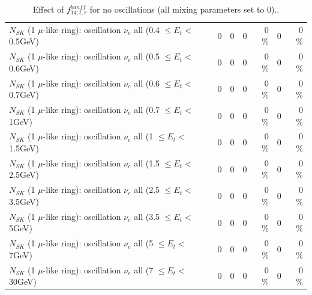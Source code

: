 \begin{table}
\begin{tabular}{| l | r | r | r  r | r  r |}
$N_{SK}$ (1 $\mu$-like ring): oscillation $\nu_{e}$ all (0.4 $\leq E_{t} <$ 0.5GeV) &               0 &               0 &               0 &        0 \%  &               0 &        0 \%  \\ 
$N_{SK}$ (1 $\mu$-like ring): oscillation $\nu_{e}$ all (0.5 $\leq E_{t} <$ 0.6GeV) &               0 &               0 &               0 &        0 \%  &               0 &        0 \%  \\ 
$N_{SK}$ (1 $\mu$-like ring): oscillation $\nu_{e}$ all (0.6 $\leq E_{t} <$ 0.7GeV) &               0 &               0 &               0 &        0 \%  &               0 &        0 \%  \\ 
$N_{SK}$ (1 $\mu$-like ring): oscillation $\nu_{e}$ all (0.7 $\leq E_{t} <$ 1GeV) &               0 &               0 &               0 &        0 \%  &               0 &        0 \%  \\ 
$N_{SK}$ (1 $\mu$-like ring): oscillation $\nu_{e}$ all (1 $\leq E_{t} <$ 1.5GeV) &               0 &               0 &               0 &        0 \%  &               0 &        0 \%  \\ 
$N_{SK}$ (1 $\mu$-like ring): oscillation $\nu_{e}$ all (1.5 $\leq E_{t} <$ 2.5GeV) &               0 &               0 &               0 &        0 \%  &               0 &        0 \%  \\ 
$N_{SK}$ (1 $\mu$-like ring): oscillation $\nu_{e}$ all (2.5 $\leq E_{t} <$ 3.5GeV) &               0 &               0 &               0 &        0 \%  &               0 &        0 \%  \\ 
$N_{SK}$ (1 $\mu$-like ring): oscillation $\nu_{e}$ all (3.5 $\leq E_{t} <$ 5GeV) &               0 &               0 &               0 &        0 \%  &               0 &        0 \%  \\ 
 $N_{SK}$ (1 $\mu$-like ring): oscillation $\nu_{e}$ all (5 $\leq E_{t} <$ 7GeV) &               0 &               0 &               0 &        0 \%  &               0 &        0 \%  \\ 
$N_{SK}$ (1 $\mu$-like ring): oscillation $\nu_{e}$ all (7 $\leq E_{t} <$ 30GeV) &               0 &               0 &               0 &        0 \%  &               0 &        0 \%  \\ 
\hline
\hline
\end{tabular}
\caption{ Effect of $f_{14; t, r}^{banff}$ for no oscillations (all mixing parameters set to 0).. }
\label{tab:num_banff_14_1RmuT_3f_osc_t13:0}
\end{table}
\clearpage
